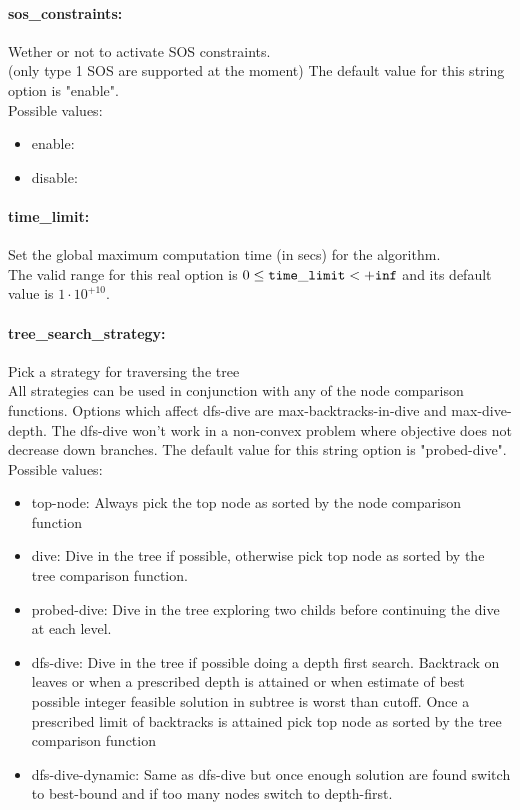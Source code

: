 \paragraph{sos\_constraints:}\label{sec:sos_constraints} Wether or not to activate SOS constraints. $\;$ \\
 (only type 1 SOS are supported at the moment)
The default value for this string option is "enable".
\\ 
Possible values:
\begin{itemize}
   \item enable: 
   \item disable: 
\end{itemize}

\paragraph{time\_limit:}\label{sec:time_limit} Set the global maximum computation time (in secs) for the algorithm. $\;$ \\
 The valid range for this real option is 
$0 \le {\tt time\_limit } <  {\tt +inf}$
and its default value is $1 \cdot 10^{+10}$.


\paragraph{tree\_search\_strategy:}\label{sec:tree_search_strategy} Pick a strategy for traversing the tree $\;$ \\
 All strategies can be used in conjunction with
any of the node comparison functions. Options
which affect dfs-dive are max-backtracks-in-dive
and max-dive-depth. The dfs-dive won't work in a
non-convex problem where objective does not
decrease down branches.
The default value for this string option is "probed-dive".
\\ 
Possible values:
\begin{itemize}
   \item top-node:  Always pick the top node as sorted by the node
comparison function
   \item dive: Dive in the tree if possible, otherwise pick
top node as sorted by the tree comparison
function.
   \item probed-dive: Dive in the tree exploring two childs before
continuing the dive at each level.
   \item dfs-dive: Dive in the tree if possible doing a depth
first search. Backtrack on leaves or when a
prescribed depth is attained or when estimate
of best possible integer feasible solution in
subtree is worst than cutoff. Once a prescribed
limit of backtracks is attained pick top node
as sorted by the tree comparison function
   \item dfs-dive-dynamic: Same as dfs-dive but once enough solution are
found switch to best-bound and if too many
nodes switch to depth-first.
\end{itemize}

